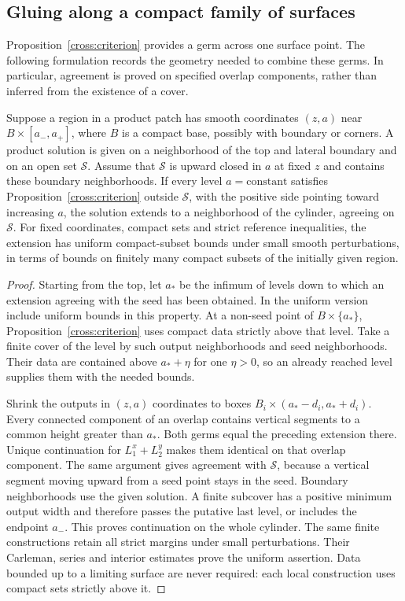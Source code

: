 \subsection{Gluing along a compact family of surfaces}

Proposition~\ref{cross:criterion} provides a germ across one surface
point.  The following formulation records the geometry needed to
combine these germs.  In particular, agreement is proved on specified
overlap components, rather than inferred from the existence of a cover.

\begin{lemma}
\label{cross:propagation}
Suppose a region in a product patch has smooth coordinates $(z,a)$
near $B\times[a_-,a_+]$, where $B$ is a compact base, possibly with
boundary or corners.  A product solution is given on a neighborhood
of the top and lateral boundary and on an open set $\mathcal S$.
Assume that $\mathcal S$ is upward closed in $a$ at fixed $z$ and
contains these boundary neighborhoods.  If every level $a=\text{constant}$
satisfies Proposition~\ref{cross:criterion} outside $\mathcal S$, with
the positive side pointing toward increasing $a$, the solution extends
to a neighborhood of the cylinder, agreeing on $\mathcal S$.
For fixed coordinates, compact sets and strict reference inequalities,
the extension has uniform compact-subset bounds under small smooth
perturbations, in terms of bounds on finitely many compact subsets of
the initially given region.
\end{lemma}

\begin{proof}
Starting from the top, let $a_*$ be the infimum of levels down to which
an extension agreeing with the seed has been obtained.  In the uniform
version include uniform bounds in this property.  At a non-seed point
of $B\times\{a_*\}$, Proposition~\ref{cross:criterion} uses compact
data strictly above that level.  Take a finite cover of the level by
such output neighborhoods and seed neighborhoods.  Their data are
contained above $a_*+\eta$ for one $\eta>0$, so an already reached
level supplies them with the needed bounds.

Shrink the outputs in $(z,a)$ coordinates to boxes
$B_i\times(a_*-d_i,a_*+d_i)$.
Every connected component of an overlap contains vertical segments
to a common height greater than $a_*$.  Both germs equal the preceding
extension there.  Unique continuation for $L_1^x+L_2^y$ makes them
identical on that overlap component.  The same argument gives agreement
with $\mathcal S$, because a vertical segment moving upward from a
seed point stays in the seed.  Boundary neighborhoods use the given
solution.  A finite subcover has a positive minimum output width and
therefore passes the putative last level, or includes the endpoint
$a_-$.  This proves continuation on the whole cylinder.
The same finite constructions retain all strict margins under small
perturbations.  Their Carleman, series and interior estimates prove
the uniform assertion.  Data bounded up to a limiting surface are
never required: each local construction uses compact sets strictly
above it.
\end{proof}

